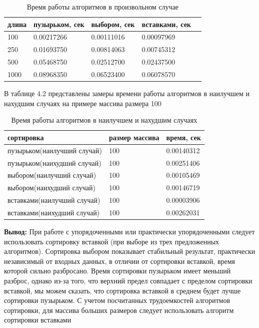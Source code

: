\documentclass[12pt]{report}
\begin{document}
\begin{table}[H]
	\caption{\label{tabular:rand} Время работы алгоритмов в произвольном случае}
	\begin{center}
		
		\begin{tabular}{ | l | l | l | l | l | }
			\hline
			длина & пузырьком, сек & выбором, сек & вставками, сек\\
			\hline
			100 & 0.00217266 & 0.00111016 & 0.00097969 \\
			250 & 0.01693750 & 0.00814063 & 0.00745312 \\
			500 & 0.05468750 & 0.02512700 & 0.02437500 \\
			1000 & 0.08968350 &  0.06523400  & 0.06078570 \\
			\hline
		\end{tabular}
	\end{center}
\end{table} 

 В таблице 4.2 представлены замеры времени работы алгоритмов в наилучшем и нахудшим случаях на примере массива размера 100

\begin{table}[H]
	\caption{\label{tabular:rand} Время работы алгоритмов в наилучшем и нахудшим случаях}
	\begin{center}
		
		\begin{tabular}{ | l | l | l | }
			\hline
			сортировка & размер массива & время, сек\\
			\hline
			пузырьком(наилучший случай) & 100 & 0.00140312 \\
			пузырьком(наихудший случай) & 100 & 0.00251406 \\
			выбором(наилучший случай) & 100 & 0.00105469 \\
			выбором(наихудший случай) & 100 & 0.00146719 \\
			вставками(наилучший случай) & 100 & 0.00003906 \\
			вставками(наихудший случай) & 100 & 0.00262031\\
			\hline
		\end{tabular}
	\end{center}
\end{table} 

\newpage
\textbf{Вывод: } 
При работе с упорядоченными или практически упорядоченными следует использовать сортировку вставкой (при выборе из трех предложенных алгоритмов). Сортировка выбором показывает стабильный результат, практически независимый от входных данных, в отличии от сортировки вставкой, время которой сильно разбросано. Время сортировки пузырьком имеет меньший разброс, однако из-за того, что верхний предел совпадает с пределом сортировки вставкой, мы можем сказать, что сортировка вставкой в среднем будет лучше сортировки пузырьком. С учетом посчитанных трудоемкостей алгоритмов сортировки, для массива больших размеров следует использовать алгоритм сортировки вставками
\end{document}
